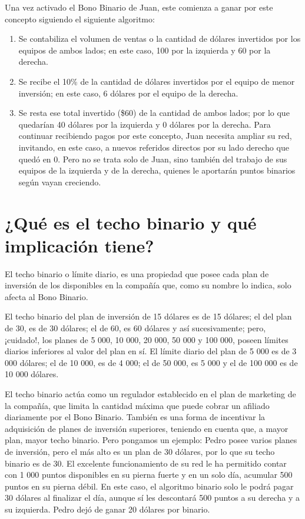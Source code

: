 \documentclass[12pt,letterpaper]{article}
\begin{document}
Una vez activado el Bono Binario de Juan, este comienza a ganar por este concepto siguiendo el siguiente algoritmo:

\begin{enumerate}
	\item Se contabiliza el volumen de ventas o la cantidad de dólares invertidos por los equipos de ambos lados; en este caso, 100 por la izquierda y 60 por la derecha.
	\item Se recibe el 10\% de la cantidad de dólares invertidos por el equipo de menor inversión; en este caso, 6 dólares por el equipo de la derecha.
	\item Se resta ese total invertido (\$60) de la cantidad de ambos lados; por lo que quedarían 40 dólares por la izquierda y 0 dólares por la derecha. Para continuar recibiendo pagos por este concepto, Juan necesita ampliar su red, invitando, en este caso, a nuevos referidos directos por su lado derecho que quedó en 0. Pero no se trata solo de Juan, sino también del trabajo de sus equipos de la izquierda y de la derecha, quienes le aportarán puntos binarios según vayan creciendo.
\end{enumerate}

\section{¿Qué es el techo binario y qué implicación tiene?}
El techo binario o límite diario, es una propiedad que posee cada plan de inversión de los disponibles en la compañía que, como su nombre lo indica, solo afecta al Bono Binario. 

El techo binario del plan de inversión de 15 dólares es de 15 dólares; el del plan de 30, es de 30 dólares; el de 60, es 60 dólares y así sucesivamente; pero, ¡cuidado!, los planes de 5 000, 10 000, 20 000, 50 000 y 100 000, poseen límites diarios inferiores al valor del plan en sí. El límite diario del plan de 5 000 es de 3 000 dólares; el de 10 000, es de 4 000; el de 50 000, es 5 000 y el de 100 000 es de 10 000 dólares. 

El techo binario actúa como un regulador establecido en el plan de marketing de la compañía, que limita la cantidad máxima que puede cobrar un afiliado diariamente por el Bono Binario. También es una forma de incentivar la adquisición de planes de inversión superiores, teniendo en cuenta que, a mayor plan, mayor techo binario. Pero pongamos un ejemplo: Pedro posee varios planes de inversión, pero el más alto es un plan de 30 dólares, por lo que su techo binario es de 30. El excelente funcionamiento de su red le ha permitido contar con 1 000 puntos disponibles en su pierna fuerte y en un solo día, acumular 500 puntos en su pierna débil. En este caso, el algoritmo binario solo le podrá pagar 30 dólares al finalizar el día, aunque sí les descontará 500 puntos a su derecha y a su izquierda. Pedro dejó de ganar 20 dólares por binario. 
\end{document}
